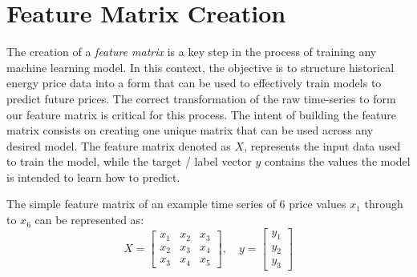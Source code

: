 \documentclass[12pt]{report} %
\begin{document}
\section{Feature Matrix Creation}

The creation of a \textit{feature matrix} is a key step in the process of training any machine learning model. In this context, the objective is to structure historical energy price data into a form that can be used to effectively train models to predict future prices. The correct transformation of the raw time-series to form our feature matrix is critical for this process. The intent of building the feature matrix consists on creating one unique matrix that can be used across any desired model. The feature matrix denoted as $\mathit{X}$, represents the input data used to train the model, while the target / label vector $\mathit{y}$ contains the values the model is intended to learn how to predict.


The simple feature matrix of an example time series of 6 price values $x_1$ through to $x_6$ can be represented as:
\begin{equation*}
{X} = \begin{bmatrix}
x_1 & x_2 & x_3 \\
x_2 & x_3 & x_4 \\
x_3 & x_4 & x_5
\end{bmatrix}, \quad
{y} = \begin{bmatrix}
y_1 \\
y_2 \\
y_3
\end{bmatrix}
\end{equation*}
\end{document}
